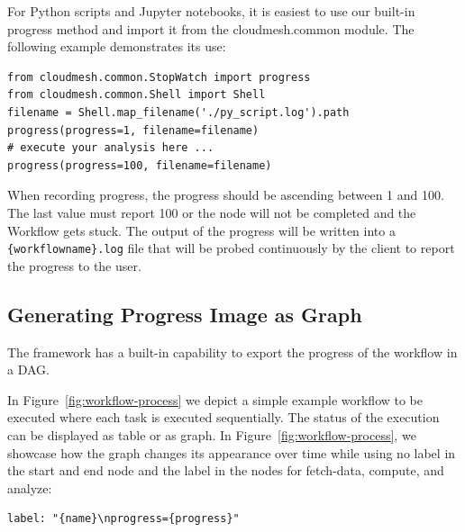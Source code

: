 For Python scripts and Jupyter notebooks, it is easiest
to use our built-in progress method and import it from the
cloudmesh.common module. The following example demonstrates its use:

\smallskip
\begin{verbatim}
from cloudmesh.common.StopWatch import progress
from cloudmesh.common.Shell import Shell
filename = Shell.map_filename('./py_script.log').path
progress(progress=1, filename=filename)
# execute your analysis here ...
progress(progress=100, filename=filename)
\end{verbatim}
\smallskip

When recording progress, the progress should be ascending between 1
and 100. The last value must report 100 or the node will not be
completed and the Workflow gets stuck. The output of the progress
will be written into a {\scriptsize \verb|{workflowname}.log|} file that will be
probed continuously by the client to report the progress to the user.

\subsection{Generating Progress Image as Graph}

The framework has a built-in capability to export the progress of the
workflow in a DAG.

In Figure~\ref{fig:workflow-process} we depict a simple example
workflow to be executed where each task is executed sequentially. The
status of the execution can be displayed as table or as graph. In
Figure~\ref{fig:workflow-process}, we showcase how the graph changes
its appearance over time while using no label in the start and end
node and the label in the nodes for fetch-data, compute, and analyze:

\begin{verbatim}
label: "{name}\nprogress={progress}"
\end{verbatim}

